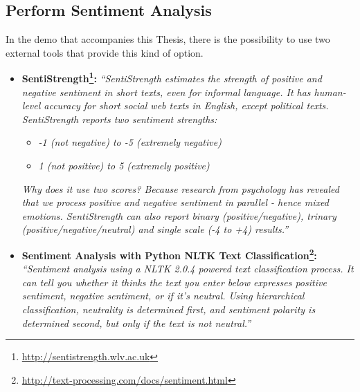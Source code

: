 \subsection{Perform Sentiment Analysis}\label{342_ref}
In the demo that accompanies this Thesis, there is the possibility to use two external tools that provide this kind of option.\\
\begin{itemize}
	\item
	 \textbf{SentiStrength\footnote{\url{http://sentistrength.wlv.ac.uk}}:}
	 \textit{“SentiStrength estimates the strength of positive and negative sentiment in short texts, even for informal language. It has human-level accuracy for short social web texts in English, except political texts. SentiStrength reports two sentiment strengths:}\\

	\begin{itemize}
		\item \textit{-1 (not negative) to -5 (extremely negative)}
		\item \textit{1 (not positive) to 5 (extremely positive)}\\
	\end{itemize}


\textit{Why does it use two scores? Because research from psychology has revealed that we process positive and negative sentiment in parallel - hence mixed emotions.
SentiStrength can also report binary (positive/negative), trinary (positive/negative/neutral) and single scale (-4 to +4) results.”}\\

	\item
	\textbf{Sentiment Analysis with Python NLTK Text Classification\footnote{\url{http://text-processing.com/docs/sentiment.html}}:} 
	\textit{“Sentiment analysis using a NLTK 2.0.4 powered text classification process. It can tell you whether it thinks the text you enter below expresses positive sentiment, negative sentiment, or if it's neutral. Using hierarchical classification, neutrality is determined first, and sentiment polarity is determined second, but only if the text is not neutral.”}
\end{itemize}









